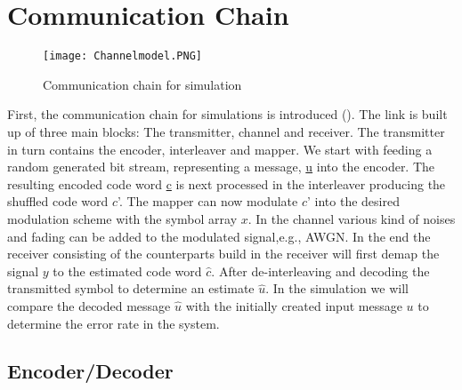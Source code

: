 \chapter{Communication Chain} 
\label{chap:commchain}
\graphicspath{{C:/Users/Kevin/Bachelarbeit/Bachelorarbeit/01_Bachelorarbeit_LaTex/02_Figures/}}


\begin{figure}[!htb]
    \centering
    \texttt{[image: Channelmodel.PNG]}
    \caption{Communication chain for simulation}
    \label{fig:commchain}
\end{figure}

First, the communication chain for simulations is introduced (). The link is built up of three main blocks: The transmitter, channel and receiver. The transmitter in turn contains the encoder, interleaver and mapper. We start with feeding a random generated bit stream, representing a message, \underline{u} into the encoder. The resulting encoded code word \underline{c} is next processed in the interleaver producing the shuffled code word \underline{$c$}'. The mapper can now modulate \underline{$c$}' into the desired modulation scheme with the symbol array \underline{$x$}. In the channel various kind of noises and fading can be added to the modulated signal,e.g., \gls{AWGN}. In the end the receiver consisting of the counterparts build in the receiver will first demap the signal \underline{$y$} to the estimated code word \underline{$\hat{c}$}. After de-interleaving and decoding the transmitted symbol to determine an estimate \underline{$\hat{u}$}. In the simulation we will compare the decoded message \underline{$\hat{u}$} with the initially created input message \underline{$u$} to determine the error rate in the system.

\section{Encoder/Decoder}
\label{sec:enc}

